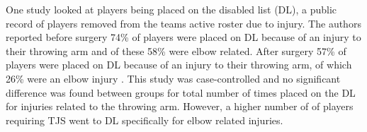 One study looked at players being placed on the disabled list (DL), a public record of players removed from the teams active roster due to injury. The authors reported before surgery 74\% of players were placed on DL because of an injury to their throwing arm and of these 58\% were elbow related. After surgery 57\% of players were placed on DL because of an injury to their throwing arm, of which 26\% were an elbow injury \cite{Makhni2014}. This study was case-controlled and no significant difference was found between groups for total number of times placed on the DL for injuries related to the throwing arm. However, a higher number of of players requiring TJS went to DL specifically for elbow related injuries. \cite{Makhni2014}